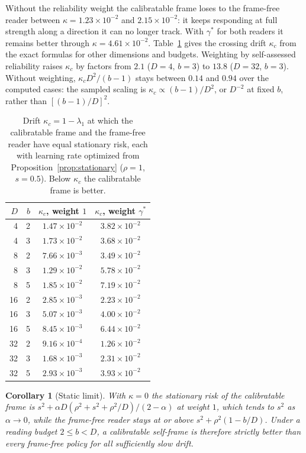 \documentclass[12pt]{article}
\newtheorem{corollary}[theorem]{Corollary}
\theoremstyle{definition}
\begin{document}
Without the reliability weight the calibratable frame loses to the frame-free reader between $\kappa=1.23\times10^{-2}$ and $2.15\times10^{-2}$: it keeps responding at full strength along a direction it can no longer track. With $\gamma^*$ for both readers it remains better through $\kappa=4.61\times10^{-2}$. Table~\ref{tab:threshold} gives the crossing drift $\kappa_c$ from the exact formulas for other dimensions and budgets. Weighting by self-assessed reliability raises $\kappa_c$ by factors from $2.1$ ($D=4$, $b=3$) to $13.8$ ($D=32$, $b=3$). Without weighting, $\kappa_cD^2/(b-1)$ stays between $0.14$ and $0.94$ over the computed cases: the sampled scaling is $\kappa_c\propto(b-1)/D^2$, or $D^{-2}$ at fixed $b$, rather than $[(b-1)/D]^2$.

\begin{table}[t]
\centering
\small
\begin{tabular}{rrcc}
\toprule
$D$ & $b$ & $\kappa_c$, weight $1$ & $\kappa_c$, weight $\gamma^*$ \\
\midrule
4 & 2 & $1.47\times10^{-2}$ & $3.82\times10^{-2}$\\
4 & 3 & $1.73\times10^{-2}$ & $3.68\times10^{-2}$\\
8 & 2 & $7.66\times10^{-3}$ & $3.49\times10^{-2}$\\
8 & 3 & $1.29\times10^{-2}$ & $5.78\times10^{-2}$\\
8 & 5 & $1.85\times10^{-2}$ & $7.19\times10^{-2}$\\
16 & 2 & $2.85\times10^{-3}$ & $2.23\times10^{-2}$\\
16 & 3 & $5.07\times10^{-3}$ & $4.00\times10^{-2}$\\
16 & 5 & $8.45\times10^{-3}$ & $6.44\times10^{-2}$\\
32 & 2 & $9.16\times10^{-4}$ & $1.26\times10^{-2}$\\
32 & 3 & $1.68\times10^{-3}$ & $2.31\times10^{-2}$\\
32 & 5 & $2.93\times10^{-3}$ & $3.93\times10^{-2}$\\
\bottomrule
\end{tabular}
\caption{Drift $\kappa_c=1-\lambda_1$ at which the calibratable frame and the frame-free reader have equal stationary risk, each with learning rate optimized from Proposition~\ref{prop:stationary} ($\rho=1$, $s=0.5$). Below $\kappa_c$ the calibratable frame is better.}
\label{tab:threshold}
\end{table}

\begin{corollary}[Static limit]
\label{cor:static}
With $\kappa=0$ the stationary risk of the calibratable frame is $s^2+\alpha D(\rho^2+s^2+\rho^2/D)/(2-\alpha)$ at weight $1$, which tends to $s^2$ as $\alpha\to0$, while the frame-free reader stays at or above $s^2+\rho^2(1-b/D)$. Under a reading budget $2\le b<D$, a calibratable self-frame is therefore strictly better than every frame-free policy for all sufficiently slow drift.
\end{corollary}
\end{document}
